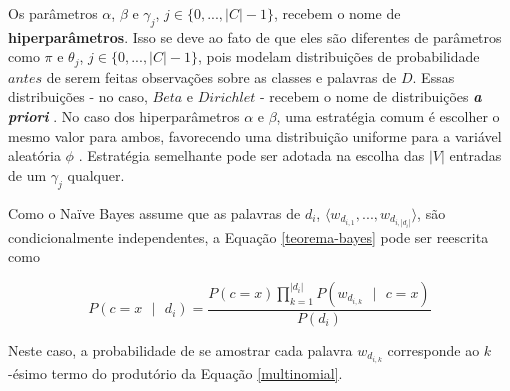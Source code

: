 Os parâmetros \ensuremath{\alpha}, \ensuremath{\beta} e \ensuremath{\gamma_j}, \ensuremath{j \in \{0, ..., |C| - 1\}}, recebem o nome de \textbf{hiperparâmetros}. Isso se deve ao fato de que eles são diferentes de parâmetros como \ensuremath{\pi} e \ensuremath{\theta_j}, \ensuremath{j \in \{0, ..., |C| - 1\}}, pois modelam distribuições de probabilidade \ensuremath{antes} de serem feitas observações sobre as classes e palavras de \ensuremath{D}. Essas distribuições - no caso, \ensuremath{Beta} e \ensuremath{Dirichlet} - recebem o nome de distribuições \textbf{\emph{a priori}} \cite{bishop}. No caso dos hiperparâmetros \ensuremath{\alpha} e \ensuremath{\beta}, uma estratégia comum é escolher o mesmo valor para ambos, favorecendo uma distribuição uniforme para a variável aleatória \ensuremath{\phi} \cite{nigam}. Estratégia semelhante pode ser adotada na escolha das \ensuremath{|V|} entradas de um \ensuremath{\gamma_j} qualquer.


Como o Naïve Bayes assume que as palavras de \ensuremath{d_i}, \ensuremath{\langle w_{d_{i,1}}, ..., w_{d_{i,|d_i|}} \rangle}, são condicionalmente independentes, a Equação \ref{teorema-bayes} pode ser reescrita como \cite{naive-forty}

\begin{equation}
\label{teorema-bayes2}
\ensuremath{P(c = x\mbox{ }|\mbox{ }d_i) = \frac{P(c = x)\prod_{k = 1}^{|d_i|}P(w_{d_{i,k}}\mbox{ }|\mbox{ }c = x)}{P(d_i)}}
\end{equation}

Neste caso, a probabilidade de se amostrar cada palavra \ensuremath{w_{d_{i,k}}} corresponde ao \ensuremath{k}-ésimo termo do produtório da Equação \ref{multinomial}.


